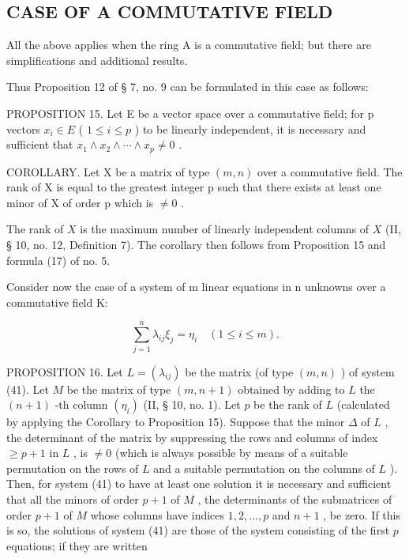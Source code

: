 \subsection{CASE OF A COMMUTATIVE FIELD}

All the above applies when the ring A is a commutative field; but there are simplifications and additional results.

Thus Proposition 12 of § 7, no. 9 can be formulated in this case as follows:

PROPOSITION 15. Let E be a vector space over a commutative field; for p vectors \(x_{i} \in E\) ( \(1 \leqslant i \leqslant p\) ) to be linearly independent, it is necessary and sufficient that \(x_{1} \wedge x_{2} \wedge \cdots \wedge x_{p} \neq 0\) .

COROLLARY. Let X be a matrix of type \((m, n)\) over a commutative field. The rank of X is equal to the greatest integer p such that there exists at least one minor of X of order p which is \(\neq0\) .

The rank of \(X\) is the maximum number of linearly independent columns of \(X\) (II, § 10, no. 12, Definition 7). The corollary then follows from Proposition 15 and formula (17) of no. 5.

Consider now the case of a system of m linear equations in n unknowns over a commutative field K:

\[
\sum_ {j = 1} ^ {n} \lambda_ {i j} \xi_ {j} = \eta_ {i} \quad (1 \leqslant i \leqslant m).\tag{41}
\]

PROPOSITION 16. Let \(L = (\lambda_{ij})\) be the matrix (of type \((m, n)\) ) of system (41). Let \(M\) be the matrix of type \((m, n + 1)\) obtained by adding to \(L\) the \((n + 1)\) -th column \((\eta_i)\) (II, § 10, no. 1). Let \(p\) be the rank of \(L\) (calculated by applying the Corollary to Proposition 15). Suppose that the minor \(\Delta\) of \(L\) , the determinant of the matrix by suppressing the rows and columns of index \(\geqslant p + 1\) in \(L\) , is \(\neq 0\) (which is always possible by means of a suitable permutation on the rows of \(L\) and a suitable permutation on the columns of \(L\) ). Then, for system (41) to have at least one solution it is necessary and sufficient that all the minors of order \(p + 1\) of \(M\) , the determinants of the submatrices of order \(p + 1\) of \(M\) whose columns have indices \(1, 2, \ldots, p\) and \(n + 1\) , be zero. If this is so, the solutions of system (41) are those of the system consisting of the first \(p\) equations; if they are written

